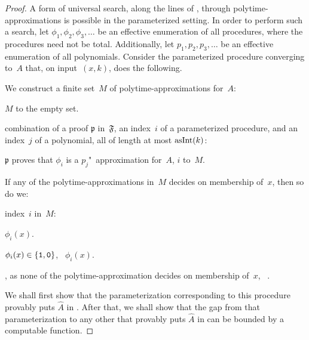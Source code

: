\begin{proof}
  A form of universal search, along the lines of \textcite{hutter2002fastest}, through polytime-approximations is possible in the parameterized setting.
  In order to perform such a search, let $\phi_1, \phi_2, \phi_3, \ldots$ be an effective enumeration of all procedures, where the procedures need not be total.
  Additionally, let $p_1, p_2, p_3, \ldots$ be an effective enumeration of all polynomials.
  Consider the parameterized procedure converging to~$A$ that, on input~$(x, k)$, does the following.
  \begin{codelisting}
  \item
    We construct a finite set~$M$ of polytime-approximations for~$A$:
    \begin{codelisting}
    \item
       $M$ to the empty set.
    \item
       combination of a proof $\mathfrak{p}$ in~$\mathfrak{F}$, an index~$i$ of a parameterized procedure, and an index~$j$ of a polynomial, all of length at most $\asNat(k)$:
      \begin{codelisting}
      \item\label{code:xpprincipal:approximations}%
         $\mathfrak{p}$ proves that $\phi_i$ is a $p_j$"~approximation for~$A$,
        \itemcont {} $i$ to~$M$.
      \end{codelisting}
    \end{codelisting}
  \item
    If any of the polytime-approximations in~$M$ decides on membership of~$x$, then so do we:
    \begin{codelisting}
    \item
       index~$i$ in~$M$:
      \begin{codelisting}
      \item
         $\phi_i(x)$.
      \item
         $\phi_i(x) \in \{\bits{1}, \bits{0}\}$, ~$\phi_i(x)$.
      \end{codelisting}
    \item
      , as none of the polytime-approximation decides on membership of~$x$, ~.
    \end{codelisting}
  \end{codelisting}

  We shall first show that the parameterization corresponding to this procedure provably puts $\hat{A}$ in .
  After that, we shall show that the gap from that parameterization to any other that provably puts $\hat{A}$ in  can be bounded by a computable function.


\end{proof}
